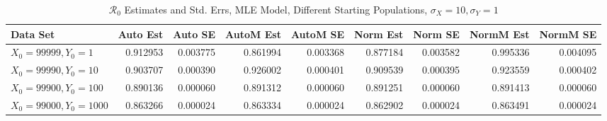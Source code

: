 \documentclass[12pt]{article}
\newcommand{\rr}{\ensuremath{\mathcal{R}_0}}
\begin{document}
\begin{table}[H]
	
	\caption{$\rr$ Estimates and Std. Errs, MLE Model,
		Different Starting Populations, 
		$\sigma_X = 10, \sigma_Y = 1$}
	\begin{footnotesize}
		\hskip -1.7cm
		\begin{tabular}{l|r|r|r|r|r|r|r|r}
			\hline
			Data Set & Auto Est & Auto SE & AutoM Est & AutoM SE & Norm Est & Norm SE & NormM Est & NormM SE\\
			\hline
			$X_0 = 99999, Y_0 = 1$ & 0.912953 & 0.003775 & 0.861994 & 0.003368 & 0.877184 & 0.003582 & 0.995336 & 0.004095\\
			\hline
			$X_0 = 99990, Y_0 = 10$ & 0.903707 & 0.000390 & 0.926002 & 0.000401 & 0.909539 & 0.000395 & 0.923559 & 0.000402\\
			\hline
			$X_0 = 99900, Y_0 = 100$ & 0.890136 & 0.000060 & 0.891312 & 0.000060 & 0.891251 & 0.000060 & 0.891413 & 0.000060\\
			\hline
			$X_0 = 99000, Y_0 = 1000$ & 0.863266 & 0.000024 & 0.863334 & 0.000024 & 0.862902 & 0.000024 & 0.863491 & 0.000024\\
			\hline
		\end{tabular}
	\end{footnotesize}
\end{table}
\end{document}
